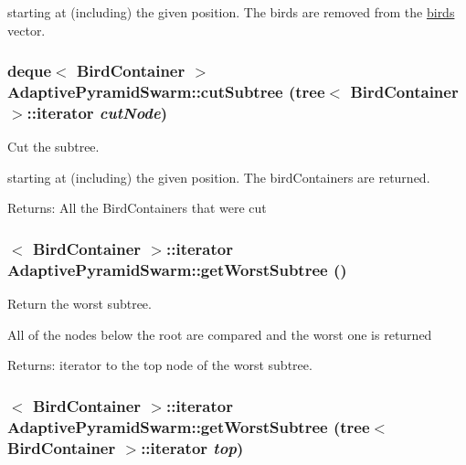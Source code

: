 starting at (including) the given position. The birds are removed from the \hyperlink{classSwarm_74191c7a473df093f5537f8d6d5ca1a6}{birds} vector. \hypertarget{classAdaptivePyramidSwarm_95f5eb1095a6dd003b1477290c80780f}{
\subsubsection{\setlength{\rightskip}{0pt plus 5cm}deque$<$ {\bf BirdContainer} $>$ AdaptivePyramidSwarm::cutSubtree ({\bf tree}$<$ {\bf BirdContainer} $>$::iterator {\em cutNode})}}
\label{classAdaptivePyramidSwarm_95f5eb1095a6dd003b1477290c80780f}


Cut the subtree. 

starting at (including) the given position. The birdContainers are returned. \begin{Desc}
\item[Returns:]All the BirdContainers that were cut \end{Desc}
\hypertarget{classAdaptivePyramidSwarm_6d57f30724f6a0b7f4f8e5a31ae11f88}{
\subsubsection{$<$ {\bf BirdContainer} $>$::iterator AdaptivePyramidSwarm::getWorstSubtree ()}}
\label{classAdaptivePyramidSwarm_6d57f30724f6a0b7f4f8e5a31ae11f88}


Return the worst subtree. 

All of the nodes below the root are compared and the worst one is returned \begin{Desc}
\item[Returns:]iterator to the top node of the worst subtree. \end{Desc}
\hypertarget{classAdaptivePyramidSwarm_b16d5e586c4f1732ca51ccdd892fe173}{
\subsubsection{$<$ {\bf BirdContainer} $>$::iterator AdaptivePyramidSwarm::getWorstSubtree ({\bf tree}$<$ {\bf BirdContainer} $>$::iterator {\em top})}}
\label{classAdaptivePyramidSwarm_b16d5e586c4f1732ca51ccdd892fe173}


